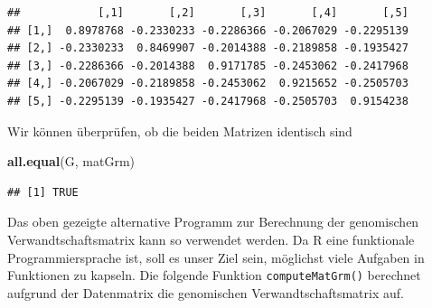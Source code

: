 \documentclass[]{book}
\newenvironment{Shaded}{\begin{snugshade}}{\end{snugshade}}
\newcommand{\KeywordTok}[1]{\textcolor[rgb]{0.13,0.29,0.53}{\textbf{{#1}}}}
\newcommand{\NormalTok}[1]{{#1}}
\begin{document}
\begin{verbatim}
##            [,1]       [,2]       [,3]       [,4]       [,5]
## [1,]  0.8978768 -0.2330233 -0.2286366 -0.2067029 -0.2295139
## [2,] -0.2330233  0.8469907 -0.2014388 -0.2189858 -0.1935427
## [3,] -0.2286366 -0.2014388  0.9171785 -0.2453062 -0.2417968
## [4,] -0.2067029 -0.2189858 -0.2453062  0.9215652 -0.2505703
## [5,] -0.2295139 -0.1935427 -0.2417968 -0.2505703  0.9154238
\end{verbatim}

Wir können überprüfen, ob die beiden Matrizen identisch sind

\begin{Shaded}
\begin{Highlighting}[]
\KeywordTok{all.equal}\NormalTok{(G, matGrm)}
\end{Highlighting}
\end{Shaded}

\begin{verbatim}
## [1] TRUE
\end{verbatim}

Das oben gezeigte alternative Programm zur Berechnung der genomischen
Verwandtschaftsmatrix kann so verwendet werden. Da R eine funktionale
Programmiersprache ist, soll es unser Ziel sein, möglichst viele
Aufgaben in Funktionen zu kapseln. Die folgende Funktion
\texttt{computeMatGrm()} berechnet aufgrund der Datenmatrix die
genomischen Verwandtschaftsmatrix auf.
\end{document}
